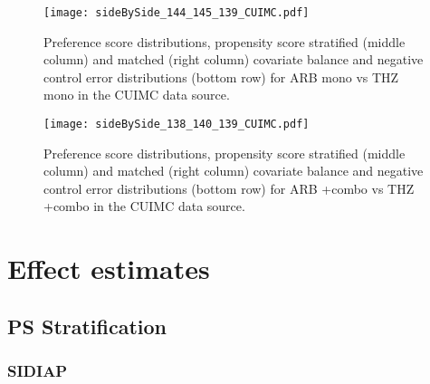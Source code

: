\documentclass[11pt,]{article}
\begin{document}
\begin{figure}
    \caption{Preference score distributions,
    propensity score stratified (middle column) and matched (right column) covariate balance
    and negative control error distributions (bottom row) for
    ARB mono vs THZ mono in the CUIMC data source.}
    \centerline{
        \texttt{[image: sideBySide\_144\_145\_139\_CUIMC.pdf]}
    }
\end{figure}
\begin{figure}
    \caption{Preference score distributions,
    propensity score stratified (middle column) and matched (right column) covariate balance
    and negative control error distributions (bottom row) for
    ARB +combo vs THZ +combo in the CUIMC data source.}
    \centerline{
        \texttt{[image: sideBySide\_138\_140\_139\_CUIMC.pdf]}
    }
\end{figure}

\clearpage

\hypertarget{effect-estimates}{%
\section{Effect estimates}\label{effect-estimates}}

\hypertarget{ps-stratification}{%
\subsection{PS Stratification}\label{ps-stratification}}

\hypertarget{sidiap-2}{%
\subsubsection{SIDIAP}\label{sidiap-2}}
\end{document}
